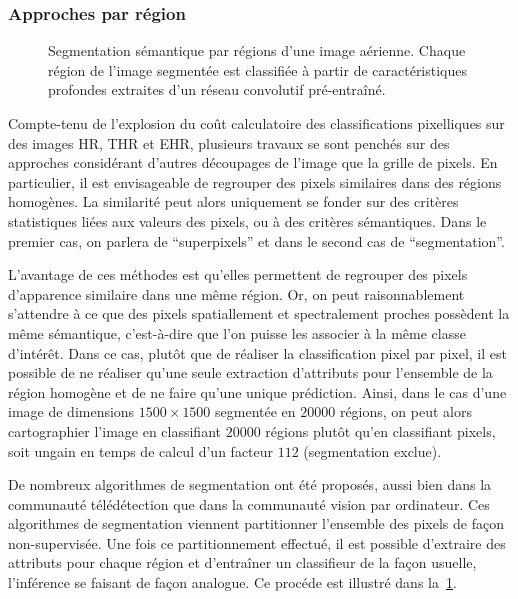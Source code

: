 \subsubsection{Approches par région}

\begin{figure}
\resizebox{\textwidth}{!}{%

}
\caption{Segmentation sémantique par régions d'une image aérienne. Chaque région de l'image segmentée est classifiée à partir de caractéristiques profondes extraites d'un réseau convolutif pré-entraîné.}
\label{fig:framework}
\end{figure}

Compte-tenu de l'explosion du coût calculatoire des classifications pixelliques sur des images \gls{HR}, \gls{THR} et \gls{EHR}, plusieurs travaux se sont penchés sur des approches considérant d'autres découpages de l'image que la grille de pixels. En particulier, il est envisageable de regrouper des pixels similaires dans des régions homogènes. La similarité peut alors uniquement se fonder sur des critères statistiques liées aux valeurs des pixels, ou à des critères sémantiques. Dans le premier cas, on parlera de ``superpixels'' et dans le second cas de ``segmentation''.

L'avantage de ces méthodes est qu'elles permettent de regrouper des pixels d'apparence similaire dans une même région. Or, on peut raisonnablement s'attendre à ce que des pixels spatiallement et spectralement proches possèdent la même sémantique, c'est-à-dire que l'on puisse les associer à la même classe d'intérêt. Dans ce cas, plutôt que de réaliser la classification pixel par pixel, il est possible de ne réaliser qu'une seule extraction d'attributs pour l'ensemble de la région homogène et de ne faire qu'une unique prédiction. Ainsi, dans le cas d'une image de dimensions $1500\times1500$ segmentée en $20 000$ régions, on peut alors cartographier l'image en classifiant $20 000$ régions plutôt qu'en classifiant  pixels, soit ungain en temps de calcul d'un facteur $112$ (segmentation exclue).

De nombreux algorithmes de segmentation ont été proposés, aussi bien dans la communauté télédétection que dans la communauté vision par ordinateur. Ces algorithmes de segmentation viennent partitionner l'ensemble des pixels de façon non-supervisée. Une fois ce partitionnement effectué, il est possible d'extraire des attributs pour chaque région et d'entraîner un classifieur de la façon usuelle, l'inférence se faisant de façon analogue. Ce procéde est illustré dans la~\cref{fig:framework}.

